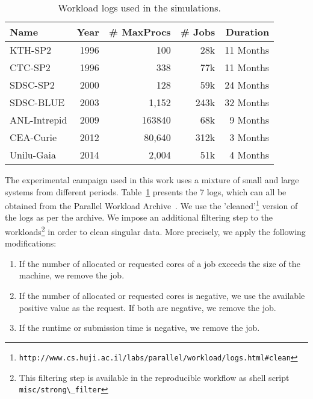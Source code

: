 \documentclass[sigconf]{acmart}
\newcommand{\ra}[1]{\renewcommand{\arraystretch}{#1}}
\begin{document}
\begin{table}[ht]
  \centering
  \ra{1.3}
  \caption{Workload logs used in the simulations.}
  \label{tab:logs}
  \begin{tabular}{@{}lrrrr@{}}
    \hline
    Name          & Year & \# MaxProcs & \# Jobs & Duration\\
    \hline
    KTH-SP2       & 1996 & 100         & 28k     & 11 Months\\
    CTC-SP2       & 1996 & 338         & 77k     & 11 Months\\
    SDSC-SP2      & 2000 & 128         & 59k     & 24 Months\\
    SDSC-BLUE     & 2003 & 1,152       & 243k    & 32 Months\\
    ANL-Intrepid  & 2009 & 163840      & 68k     & 9  Months\\
    CEA-Curie     & 2012 & 80,640      & 312k    & 3  Months\\
    Unilu-Gaia    & 2014 & 2,004        & 51k     & 4  Months\\
    \hline
  \end{tabular}
\end{table}

The experimental campaign used in this work uses a mixture of small and large
systems from different periods. Table~\ref{tab:logs} presents the 7 logs, which
can all be obtained from the Parallel Workload
Archive~\cite{Feitelson20142967}. We use the 'cleaned'\footnote{\lstinline[basicstyle=\ttfamily\color{blue}]|http://www.cs.huji.ac.il/labs/parallel/workload/logs.html#clean|} version of the logs as
per the archive. We impose an additional
filtering step to the workloads\footnote{This filtering step is available in
the reproducible workflow\cite{repro} as shell script
\lstinline[basicstyle=\ttfamily\color{blue}]|misc/strong\_filter|} in order to
clean singular data. More precisely, we apply the following modifications:

\begin{enumerate}
  \item If the number of allocated or requested cores of a job  exceeds the size of the machine, we remove the job.
  \item If the number of allocated or requested cores is negative, we use the available positive value as the request. If both are negative, we remove the job.
  \item If the runtime or submission time is negative, we remove the job.
\end{enumerate}
\end{document}
